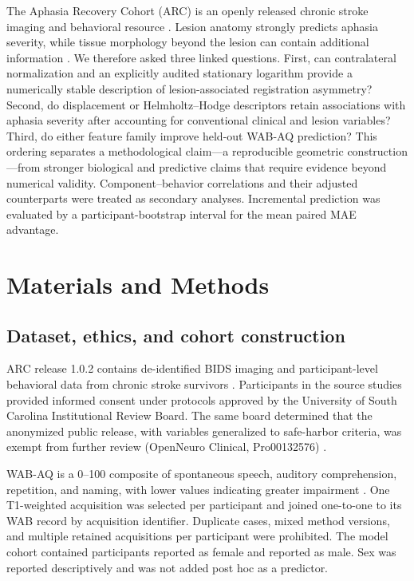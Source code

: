 \documentclass[11pt]{article}
\begin{document}
The Aphasia Recovery Cohort (ARC) is an openly released chronic stroke imaging
and behavioral resource \citep{Gibson2024}. Lesion anatomy strongly predicts
aphasia severity, while tissue morphology beyond the lesion can contain
additional information \citep{Teghipco2024}. We therefore asked three
linked questions. First, can contralateral normalization and an explicitly
audited stationary logarithm provide a numerically stable description of
lesion-associated registration asymmetry? Second, do displacement or
Helmholtz--Hodge descriptors retain associations with aphasia severity after
accounting for conventional clinical and lesion variables? Third, do either
feature family improve held-out WAB-AQ prediction? This ordering separates a
methodological claim---a reproducible geometric construction---from stronger
biological and predictive claims that require evidence beyond numerical
validity. Component--behavior correlations and their adjusted counterparts were
treated as secondary analyses. Incremental prediction was evaluated by a
participant-bootstrap interval for the mean paired MAE advantage.

\section{Materials and Methods}

\subsection{Dataset, ethics, and cohort construction}

ARC release 1.0.2 contains de-identified BIDS imaging and participant-level
behavioral data from chronic stroke survivors \citep{Gibson2024}. Participants
in the source studies provided informed consent under protocols approved by the
University of South Carolina Institutional Review Board. The same board
determined that the anonymized public release, with variables generalized to
safe-harbor criteria, was exempt from further review (OpenNeuro Clinical,
Pro00132576) \citep{Gibson2024}.

WAB-AQ is a 0--100 composite of spontaneous speech, auditory comprehension,
repetition, and naming, with lower values indicating greater impairment
\citep{Kertesz2007}. One T1-weighted acquisition was selected per participant
and joined one-to-one to its WAB record by acquisition identifier. Duplicate
cases, mixed method versions, and multiple retained acquisitions per
participant were prohibited. The model cohort contained \FemaleN{} participants
reported as female and \MaleN{} reported as male. Sex was reported
descriptively and was not added post hoc as a predictor.
\end{document}
